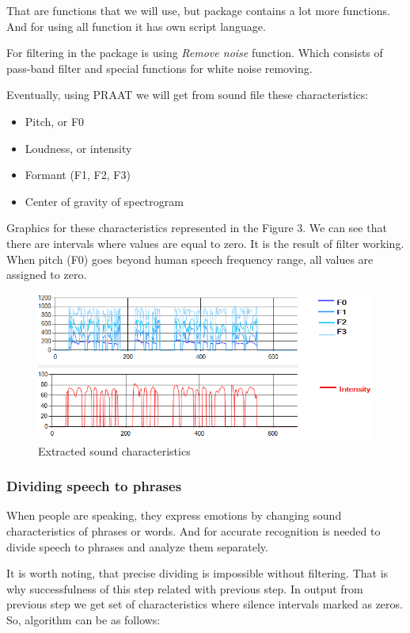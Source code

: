 \documentclass[12pt, letterpaper]{article}
\begin{document}
That are functions that we will use, but package contains a lot more functions. And for using all function it has own script language. 

For filtering in the package is using \textit{Remove noise} function. Which consists of pass-band filter and special functions for white noise removing.

Eventually, using PRAAT we will get from sound file these characteristics:
\begin{itemize}
	\item Pitch, or F0
	\item Loudness, or intensity
	\item Formant (F1, F2, F3)
	\item Center of gravity of spectrogram
\end{itemize}
Graphics for these characteristics represented in the Figure 3. We can see that there are intervals where values are equal to zero. It is the result of filter working. When pitch (F0) goes beyond human speech frequency range, all values are assigned to zero.
\begin{figure}
	\centering
		\includegraphics[scale=0.8]{images/sound-characteristics.png}
	\caption{Extracted sound characteristics}
	\label{fig:sound-characteristics}
\end{figure}

\subsubsection{Dividing speech to phrases}

When people are speaking, they express emotions by changing sound characteristics of phrases or words. And for accurate recognition is needed to divide speech to phrases and analyze them separately.

It is worth noting, that precise dividing is impossible without filtering. That is why successfulness of  this step related with previous step. In output from previous step we get set of characteristics where silence intervals marked as zeros. So, algorithm can be as follows: 
\end{document}
